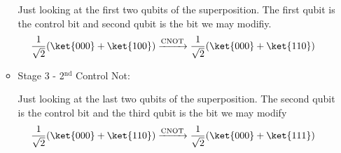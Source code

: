 \documentclass[]{article}
\begin{document}
\begin{enumerate}
\begin{itemize}
      Just looking at the first two qubits of the superposition. The first qubit is the control bit and second qubit is the bit we may modifiy.
      \begin{align*}
        & \frac{1}{\sqrt{2}}(\ket{000} + \ket{100}) \xrightarrow{\text{CNOT}} \frac{1}{\sqrt{2}}(\ket{000} + \ket{110}) 
      \end{align*}
    \item Stage 3 - 2$^{\text{nd}}$ Control Not:
      
      Just looking at the last two qubits of the superposition.  The second qubit is the control bit and the third qubit is the bit we may modify
      \begin{align*}
        & \frac{1}{\sqrt{2}}(\ket{000} + \ket{110}) \xrightarrow{\text{CNOT}} \frac{1}{\sqrt{2}}(\ket{000} + \ket{111}) 
      \end{align*}
  \end{itemize}


\end{enumerate}
\end{document}
